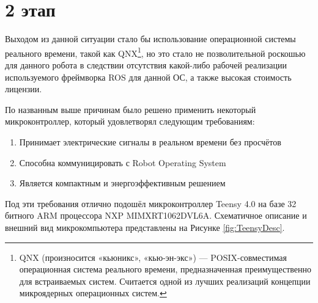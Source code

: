 \documentclass[12pt,a4paper]{scrartcl}
\begin{document}
		\section*{2 этап}
			Выходом из данной ситуации стало бы использование операционной системы реального времени, такой как QNX\footnote{QNX (произносится «кьюникс», «кью-эн-экс») — POSIX-совместимая операционная система реального времени, предназначенная преимущественно для встраиваемых систем. Считается одной из лучших реализаций концепции микроядерных операционных систем.}, но это стало не позволительной роскошью для данного робота в следствии отсутствия какой-либо рабочей реализации используемого фреймворка ROS для данной ОС, а также высокая стоимость лицензии.
			
			По названным выше причинам было решено применить некоторый микроконтроллер, который удовлетворял следующим требованиям:
			\begin{enumerate}
				\item Принимает электрические сигналы в реальном времени без просчётов
				\item Способна коммуницировать с Robot Operating System
				\item Является компактным и энергоэффективным решением
			\end{enumerate}
			
			Под эти требования отлично подошёл микроконтроллер Teensy 4.0 на базе 32 битного ARM процессора NXP MIMXRT1062DVL6A. Схематичное описание и внешний вид микрокомпьютера представлены на Рисунке \ref{fig:TeensyDesc}.
			
\end{document}
